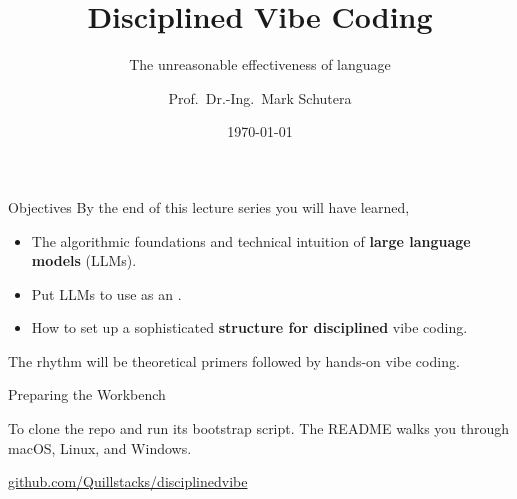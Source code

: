 \documentclass[aspectratio=169]{beamer}
\title[Disciplined Vibe Coding]{Disciplined Vibe Coding}
\subtitle{The unreasonable effectiveness of language}
\author[Schutera]{Prof.\ Dr.-Ing.\ Mark Schutera}
\institute{\textcolor{DHBWred}{DHBW}\ Ravensburg}
\date{\today}
\begin{document}
\begin{frame}[plain]
  \titlepage
\end{frame}

\begin{frame}{Objectives}
  By the end of this lecture series you will have learned,  \\
  \begin{itemize}
    \item The algorithmic foundations and technical intuition of \textbf{large language models} (LLMs).
    \item Put LLMs to use as an .
    \item How to set up a sophisticated \textbf{structure for disciplined} vibe coding.\\
  \end{itemize} 
  \vspace{1.5em}
  The rhythm will be theoretical primers followed by hands-on vibe coding.
\end{frame}


\begin{frame}{Preparing the Workbench}
  \begin{withmargin}
    \begin{tdmargin}%
      
      {\small To  clone the repo and run its bootstrap script. The README walks
      you through macOS, Linux, and Windows.}\par\smallskip
      {\tiny\href{https://github.com/Quillstacks/disciplinedvibe}{github.com/Quillstacks/disciplinedvibe}}
    \end{tdmargin}
  \end{withmargin}
\end{frame}
\end{document}
